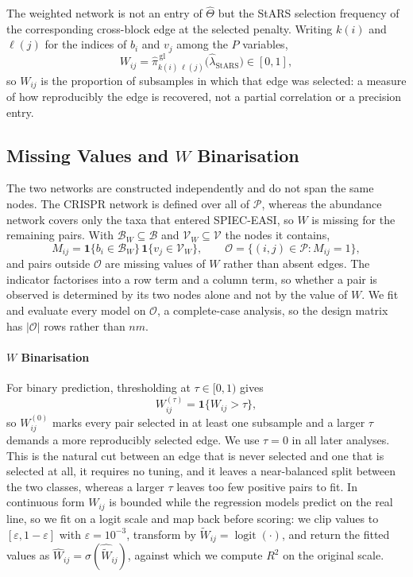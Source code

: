 The weighted network is not an entry of \(\widehat\Theta\) but the StARS selection frequency of the
corresponding cross-block edge at the selected penalty. Writing \(k(i)\) and \(\ell(j)\) for the indices
of \(b_i\) and \(v_j\) among the \(P\) variables,
\begin{equation}\label{eq:Wdef}
  W_{ij}
  =\widehat\pi^{\,\mathrm{gl}}_{k(i)\,\ell(j)}\bigl(\widehat\lambda_{\mathrm{StARS}}\bigr)\in[0,1],
\end{equation}
so \(W_{ij}\) is the proportion of subsamples in which that edge was selected: a measure of how
reproducibly the edge is recovered, not a partial correlation or a precision entry.

\subsection{Missing Values and \(W\) Binarisation}
\label{sec:mask}

The two networks are constructed independently and do not span the same nodes. The CRISPR network is
defined over all of \(\mathcal{P}\), whereas the abundance network covers only the taxa that entered
SPIEC-EASI, so \(W\) is missing for the remaining pairs. With
\(\mathcal{B}_W\subseteq\mathcal{B}\) and \(\mathcal{V}_W\subseteq\mathcal{V}\) the nodes it contains,
\begin{equation}\label{eq:maskdef}
  M_{ij}=\mathbf{1}\{b_i\in\mathcal{B}_W\}\,\mathbf{1}\{v_j\in\mathcal{V}_W\},
  \qquad
  \mathcal{O}=\bigl\{(i,j)\in\mathcal{P}:M_{ij}=1\bigr\},
\end{equation}
and pairs outside \(\mathcal{O}\) are missing values of \(W\) rather than absent edges. The indicator
factorises into a row term and a column term, so whether a pair is observed is determined by its two
nodes alone and not by the value of \(W\). We fit and evaluate every model on \(\mathcal{O}\), a complete-case
analysis, so the design matrix has \(|\mathcal{O}|\) rows rather than \(nm\).

\paragraph{\(W\) Binarisation}
For binary prediction, thresholding at \(\tau\in[0,1)\) gives
\begin{equation}\label{eq:thresh}
  W^{(\tau)}_{ij}=\mathbf{1}\{W_{ij}>\tau\},
\end{equation}
so \(W^{(0)}_{ij}\) marks every pair selected in at least one subsample and a larger \(\tau\) demands a
more reproducibly selected edge. We use \(\tau=0\) in all later analyses. This is the natural cut between
an edge that is never selected and one that is selected at all, it requires no tuning, and it leaves a
near-balanced split between the two classes, whereas a larger \(\tau\) leaves too few positive pairs to
fit. In continuous form \(W_{ij}\) is bounded while the regression models predict on the real line, so we
fit on a logit scale and map back before scoring: we clip values to \([\varepsilon,1-\varepsilon]\) with
\(\varepsilon=10^{-3}\), transform by \(\widetilde W_{ij}=\operatorname{logit}(\cdot)\), and return the
fitted values as \(\widehat W_{ij}=\sigma(\widehat{\widetilde W}_{ij})\), against which we compute
\(R^{2}\) on the original scale.

